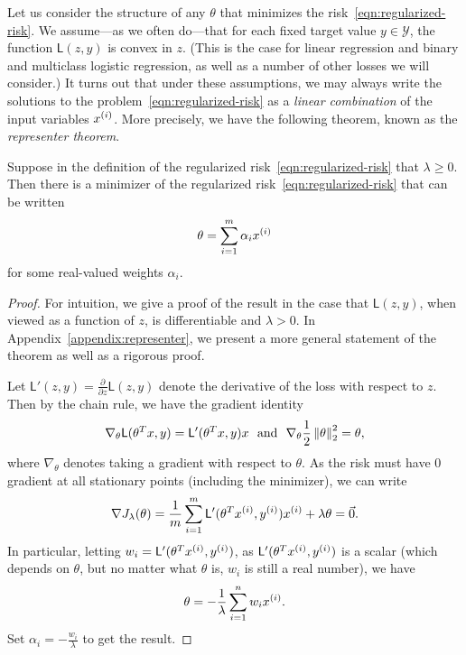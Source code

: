 \documentclass{article}
\newcommand{\loss}{\mathsf{L}}
\newcommand{\mc}[1]{\mathcal{#1}}
\newcommand{\half}{\frac{1}{2}}
\begin{document}
Let us consider the structure of any $\theta$ that minimizes the
risk~\eqref{eqn:regularized-risk}. We assume---as we often do---that for
each fixed target value $y \in \mc{Y}$, the function $\loss(z, y)$ is convex
in $z$. (This is the case for linear regression and binary and multiclass
logistic regression, as well as a number of other losses we will consider.)
It turns out that under these assumptions, we may always write the solutions
to the problem~\eqref{eqn:regularized-risk} as a \emph{linear combination}
of the input variables ${x^{(i)}}$. More precisely, we have the following
theorem, known as the \emph{representer theorem}.
\begin{theorem}
  \label{theorem:representer}
  Suppose in the definition of the regularized
  risk~\eqref{eqn:regularized-risk} that $\lambda \ge 0$.  Then there is a
  minimizer of the regularized risk~\eqref{eqn:regularized-risk} that can be
  written
  \begin{equation*}
    \theta = \sum_{i = 1}^m \alpha_i {x^{(i)}}
  \end{equation*}
  for some real-valued weights $\alpha_i$.
\end{theorem}
\begin{proof}
  For intuition, we give a proof of the result in the case that $\loss(z,
  y)$, when viewed as a function of $z$, is differentiable and $\lambda >
  0$.  In Appendix~\ref{appendix:representer}, we present a more general
  statement of the theorem as well as a rigorous proof.

  Let $\loss'(z, y) = \frac{\partial}{\partial z} \loss(z, y)$ denote the 
  derivative of the loss with respect to $z$. Then by the chain rule,
  we have the gradient identity
  \begin{equation*}
    \nabla_\theta \loss(\theta^T x, y)
    = \loss'(\theta^T x, y) x
    ~~ \mbox{and} ~~
    \nabla_\theta \half \ltwo{\theta}^2 = \theta,
  \end{equation*}
  where $\nabla_\theta$ denotes taking a gradient with respect to
  $\theta$. As the risk must have $0$ gradient at all stationary points
  (including the minimizer), we can write
  \begin{equation*}
    \nabla J_\lambda(\theta)
    = \frac{1}{m} \sum_{i = 1}^m \loss'(\theta^T \xsi, \ysi) \xsi
    + \lambda \theta = \vec{0}.
  \end{equation*}
  In particular, letting $w_i = \loss'(\theta^T \xsi, \ysi)$, as
  $\loss'(\theta^T \xsi, \ysi)$ is a scalar (which depends on $\theta$, but
  no matter what $\theta$ is, $w_i$ is still a real number),
  we have
  \begin{equation*}
    \theta = -\frac{1}{\lambda} \sum_{i = 1}^n w_i {x^{(i)}}.
  \end{equation*}
  Set $\alpha_i = -\frac{w_i}{\lambda}$ to get the result.
\end{proof}
\end{document}
